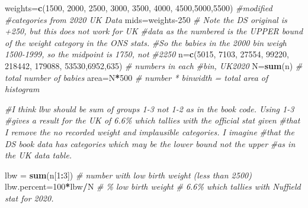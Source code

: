 \documentclass[
]{book}
\newenvironment{Shaded}{\begin{snugshade}}{\end{snugshade}}
\newcommand{\CommentTok}[1]{\textcolor[rgb]{0.56,0.35,0.01}{\textit{#1}}}
\newcommand{\DecValTok}[1]{\textcolor[rgb]{0.00,0.00,0.81}{#1}}
\newcommand{\FunctionTok}[1]{\textcolor[rgb]{0.13,0.29,0.53}{\textbf{#1}}}
\newcommand{\NormalTok}[1]{#1}
\newcommand{\OtherTok}[1]{\textcolor[rgb]{0.56,0.35,0.01}{#1}}
\newcommand{\SpecialCharTok}[1]{\textcolor[rgb]{0.81,0.36,0.00}{\textbf{#1}}}
\begin{document}
\begin{Shaded}
\begin{Highlighting}[]
\NormalTok{weights}\OtherTok{=}\FunctionTok{c}\NormalTok{(}\DecValTok{1500}\NormalTok{, }\DecValTok{2000}\NormalTok{, }\DecValTok{2500}\NormalTok{, }\DecValTok{3000}\NormalTok{, }\DecValTok{3500}\NormalTok{, }\DecValTok{4000}\NormalTok{, }\DecValTok{4500}\NormalTok{,}\DecValTok{5000}\NormalTok{,}\DecValTok{5500}\NormalTok{) }\CommentTok{\#modified}
\CommentTok{\#categories from 2020 UK Data}
\NormalTok{mids}\OtherTok{=}\NormalTok{weights}\DecValTok{{-}250} \CommentTok{\# Note the DS original is +250, but this does not work for UK}
\CommentTok{\#data as the numbered is the UPPER bound of the weight category in the ONS stats.}
\CommentTok{\#So the babies in the \textquotesingle{}2000\textquotesingle{} bin weigh 1500{-}1999, so the midpoint is 1750, not}
\CommentTok{\#2250}
\NormalTok{n}\OtherTok{=}\FunctionTok{c}\NormalTok{(}\DecValTok{5015}\NormalTok{, }\DecValTok{7103}\NormalTok{, }\DecValTok{27554}\NormalTok{, }\DecValTok{99220}\NormalTok{, }\DecValTok{218442}\NormalTok{, }\DecValTok{179088}\NormalTok{, }\DecValTok{53530}\NormalTok{,}\DecValTok{6952}\NormalTok{,}\DecValTok{635}\NormalTok{) }\CommentTok{\# numbers in each}
\CommentTok{\#bin, UK2020}
\NormalTok{N}\OtherTok{=}\FunctionTok{sum}\NormalTok{(n)  }\CommentTok{\# total number of babies}
\NormalTok{area}\OtherTok{=}\NormalTok{N}\SpecialCharTok{*}\DecValTok{500}  \CommentTok{\# number * binwidth = total area of histogram}

\CommentTok{\#I think lbw should be sum of groups 1{-}3 not 1{-}2 as in the book code. Using 1{-}3}
\CommentTok{\#gives a result for the UK of 6.6\% which tallies with the official stat given}
\CommentTok{\#that I remove the \textquotesingle{}no recorded weight\textquotesingle{} and \textquotesingle{}implausible\textquotesingle{} categories\textquotesingle{}. I imagine}
\CommentTok{\#that the DS book data has categories which may be the lower bound not the upper}
\CommentTok{\#as in the UK data table.}

\NormalTok{lbw   }\OtherTok{=} \FunctionTok{sum}\NormalTok{(n[}\DecValTok{1}\SpecialCharTok{:}\DecValTok{3}\NormalTok{])   }\CommentTok{\# number with low birth weight (less than 2500)}
\NormalTok{lbw.percent}\OtherTok{=}\DecValTok{100}\SpecialCharTok{*}\NormalTok{lbw}\SpecialCharTok{/}\NormalTok{N  }\CommentTok{\# \% low birth weight}
\CommentTok{\# 6.6\% which tallies with Nuffield stat for 2020.}
\end{Highlighting}
\end{Shaded}
\end{document}
